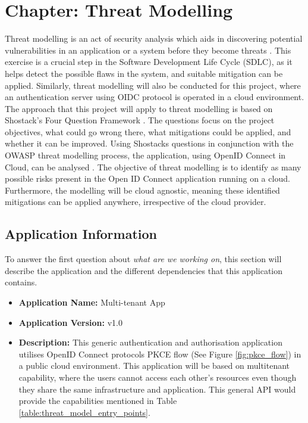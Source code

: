 \chapter{Chapter: Threat Modelling}
\label{chap:threat_model}
Threat modelling is an act of security analysis which aids in discovering potential vulnerabilities in an application or a system before they become threats \citep{threat_model_intro}. This exercise is a crucial step in the Software Development Life Cycle (SDLC), as it helps detect the possible flaws in the system, and suitable mitigation can be applied. Similarly, threat modelling will also be conducted for this project, where an authentication server using OIDC protocol is operated in a cloud environment. The approach that this project will apply to threat modelling is based on Shostack's Four Question Framework \citep{shostack}. The questions focus on the project objectives, what could go wrong there, what mitigations could be applied, and whether it can be improved. Using Shostacks questions in conjunction with the OWASP threat modelling process, the application, using OpenID Connect in Cloud, can be analysed \citep{owasp_threat_model}. The objective of threat modelling is to identify as many possible risks present in the Open ID Connect application running on a cloud. Furthermore, the modelling will be cloud agnostic, meaning these identified mitigations can be applied anywhere, irrespective of the cloud provider.


\section{Application Information}
To answer the first question about \textit{what are we working on}, this section will describe the application and the different dependencies that this application contains.
\begin{itemize}
    \item \textbf{Application Name:} Multi-tenant App
    \item \textbf{Application Version:} v1.0
    \item \textbf{Description:} This generic authentication and authorisation application utilises OpenID Connect protocols PKCE flow (See Figure \ref{fig:pkce_flow}) in a public cloud environment. This application will be based on multitenant capability, where the users cannot access each other's resources even though they share the same infrastructure and application. This general API would provide the capabilities mentioned in Table \ref{table:threat_model_entry_points}.
  \end{itemize}

